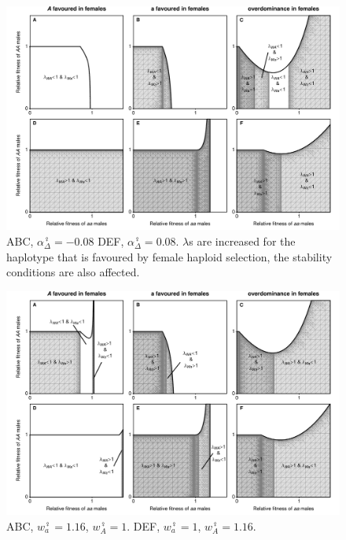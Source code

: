 \documentclass[12pt]{article}
\begin{document}
\begin{figure}[!h]
\centering
\centerline{\includegraphics[width=\linewidth]{Region_Plot_combined_FemaleDrive_Mike}}
\caption{
ABC, $\alpha_{\Delta}^\female=-0.08$
DEF, $\alpha_{\Delta}^\female=0.08$. $\lambda$s are increased for the haplotype that is favoured by female haploid selection, the stability conditions are also affected. 
}
\label{fig:regionFemaleDrive}
\end{figure}

\begin{figure}[!h]
\centering
\centerline{\includegraphics[width=\linewidth]{Region_Plot_combined_FemaleGS_Mike}}
\caption{
ABC, $w_{a}^\female=1.16$, $w_{A}^\female=1$.
DEF, $w_{a}^\female=1$, $w_{A}^\female=1.16$. 
}
\label{fig:regionFemaleGS}
\end{figure}
\end{document}
